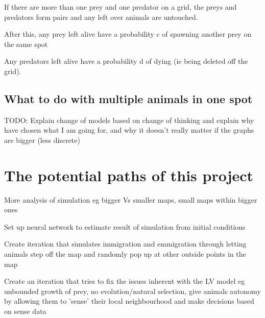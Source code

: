 \documentclass[12pt, a4paper]{article}
\begin{document}
If there are more than one prey and one predator on a grid, the preys and predators form pairs and any left over animals are untouched.

 After this, any prey left alive have a probability c of spawning another prey on the same spot

Any predators left alive have a probability d of dying (ie being deleted off the grid).

\subsection{What to do with multiple animals in one spot}
TODO: Explain change of models based on change of thinking and explain why have chosen what I am going for, and why it doesn't really matter if the graphs are bigger (less discrete)

\section{The potential paths of this project}
More analysis of simulation eg bigger Vs smaller maps, small maps within bigger ones

Set up neural network to estimate result of simulation from initial conditions

Create iteration that simulates immigration and emmigration through letting animals step off the map and randomly pop up at other outside points in the map

Create an iteration that tries to fix the issues inherent with the LV model eg unbounded growth of prey, no evolution/natural selection, give animals autonomy by allowing them to 'sense' their local neighbourhood and make decisions based on sense data


\end{document}
